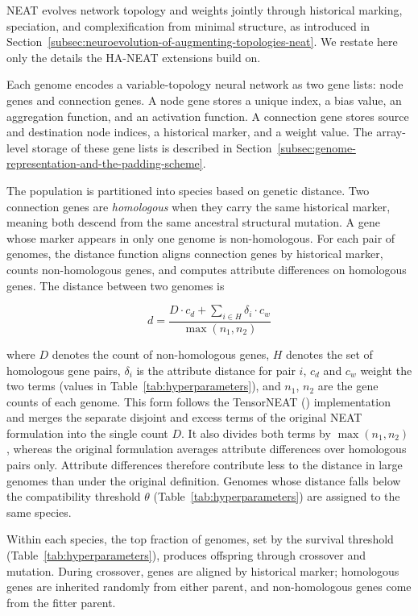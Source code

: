 \documentclass[12pt]{article}
\begin{document}
NEAT evolves network topology and weights jointly through historical marking, speciation, and complexification from minimal structure, as introduced in Section~\ref{subsec:neuroevolution-of-augmenting-topologies-neat}.
We restate here only the details the HA-NEAT extensions build on.

Each genome encodes a variable-topology neural network as two gene lists: node genes and connection genes.
A node gene stores a unique index, a bias value, an aggregation function, and an activation function.
A connection gene stores source and destination node indices, a historical marker, and a weight value.
The array-level storage of these gene lists is described in Section~\ref{subsec:genome-representation-and-the-padding-scheme}.

The population is partitioned into species based on genetic distance.
Two connection genes are \emph{homologous} when they carry the same historical marker, meaning both descend from the same ancestral structural mutation. A gene whose marker appears in only one genome is non-homologous.
For each pair of genomes, the distance function aligns connection genes by historical marker, counts non-homologous genes, and computes attribute differences on homologous genes.
The distance between two genomes is

\[d = \frac{D \cdot c_d + \sum_{i \in H} \delta_i \cdot c_w}{\max(n_1, n_2)}\]

where $D$ denotes the count of non-homologous genes, $H$ denotes the set of homologous gene pairs, $\delta_i$ is the attribute distance for pair $i$, $c_d$ and $c_w$ weight the two terms (values in Table~\ref{tab:hyperparameters}), and $n_1$, $n_2$ are the gene counts of each genome.
This form follows the TensorNEAT (\cite{wang_tensorized_2024}) implementation and merges the separate disjoint and excess terms of the original NEAT formulation into the single count $D$.
It also divides both terms by $\max(n_1, n_2)$, whereas the original formulation averages attribute differences over homologous pairs only. Attribute differences therefore contribute less to the distance in large genomes than under the original definition.
Genomes whose distance falls below the compatibility threshold $\theta$ (Table~\ref{tab:hyperparameters}) are assigned to the same species.

Within each species, the top fraction of genomes, set by the survival threshold (Table~\ref{tab:hyperparameters}), produces offspring through crossover and mutation.
During crossover, genes are aligned by historical marker; homologous genes are inherited randomly from either parent, and non-homologous genes come from the fitter parent.
\end{document}
